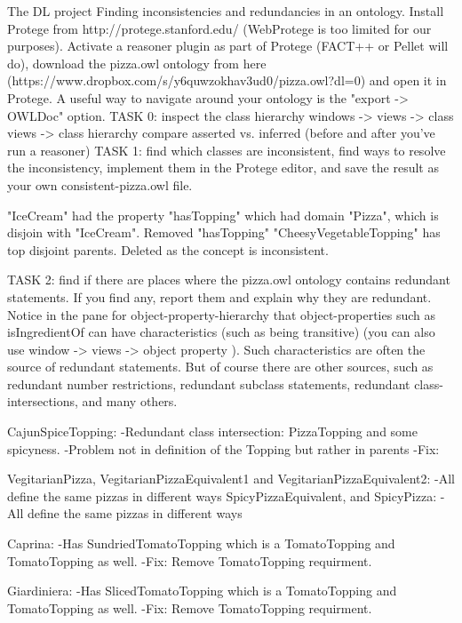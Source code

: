 The DL project
Finding inconsistencies and redundancies in an ontology.
Install Protege from http://protege.stanford.edu/ (WebProtege is too limited for our purposes). Activate a reasoner plugin as part of Protege (FACT++ or Pellet will do), download the pizza.owl ontology from here (https://www.dropbox.com/s/y6quwzokhav3ud0/pizza.owl?dl=0) and open it in Protege. A useful way to navigate around your ontology is the "export -> OWLDoc" option.
TASK 0: inspect the class hierarchy windows -> views -> class views -> class hierarchy compare asserted vs. inferred (before and after you've run a reasoner)
TASK 1: find which classes are inconsistent, find ways to resolve the inconsistency, implement them in the Protege editor, and save the result as your own consistent-pizza.owl file.

"IceCream" had the property "hasTopping" which had domain "Pizza", which is disjoin with "IceCream". Removed "hasTopping"
"CheesyVegetableTopping" has top disjoint parents. Deleted as the concept is inconsistent.

TASK 2: find if there are places where the pizza.owl ontology contains redundant statements. If you find any, report them and explain why they are redundant. Notice in the pane for object-property-hierarchy that object-properties such as isIngredientOf can have characteristics (such as being transitive) (you can also use window -> views -> object property ). Such characteristics are often the source of redundant statements. But of course there are other sources, such as redundant number restrictions, redundant subclass statements, redundant class-intersections, and many others.

CajunSpiceTopping:
-Redundant class intersection:
  PizzaTopping and some spicyness.
-Problem not in definition of the Topping but rather in parents
-Fix:

VegitarianPizza, VegitarianPizzaEquivalent1 and VegitarianPizzaEquivalent2:
-All define the same pizzas in different ways
SpicyPizzaEquivalent, and SpicyPizza:
-All define the same pizzas in different ways

Caprina:
-Has SundriedTomatoTopping which is a TomatoTopping and TomatoTopping as well.
-Fix:
  Remove TomatoTopping requirment.

Giardiniera:
-Has SlicedTomatoTopping which is a TomatoTopping and TomatoTopping as well.
-Fix:
  Remove TomatoTopping requirment.

